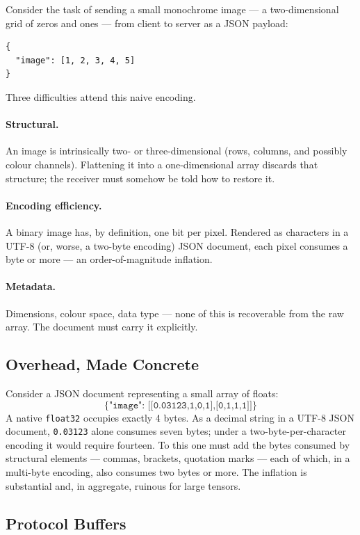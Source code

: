 \documentclass[11pt,a4paper]{article}
\theoremstyle{definition}
\theoremstyle{remark}
\begin{document}
Consider the task of sending a small monochrome image --- a two-dimensional grid of zeros and ones --- from client to server as a JSON payload:
\begin{lstlisting}
{
  "image": [1, 2, 3, 4, 5]
}
\end{lstlisting}

Three difficulties attend this naive encoding.

\paragraph{Structural.}
An image is intrinsically two- or three-dimensional (rows, columns, and possibly colour channels). Flattening it into a one-dimensional array discards that structure; the receiver must somehow be told how to restore it.

\paragraph{Encoding efficiency.}
A binary image has, by definition, one bit per pixel. Rendered as characters in a UTF-8 (or, worse, a two-byte encoding) JSON document, each pixel consumes a byte or more --- an order-of-magnitude inflation.

\paragraph{Metadata.}
Dimensions, colour space, data type --- none of this is recoverable from the raw array. The document must carry it explicitly.

\subsection{Overhead, Made Concrete}

Consider a JSON document representing a small array of floats:
\[
\texttt{\{"image": [[0.03123,1,0,1],[0,1,1,1]]\}}
\]
A native \texttt{float32} occupies exactly 4 bytes. As a decimal string in a UTF-8 JSON document, \texttt{0.03123} alone consumes seven bytes; under a two-byte-per-character encoding it would require fourteen. To this one must add the bytes consumed by structural elements --- commas, brackets, quotation marks --- each of which, in a multi-byte encoding, also consumes two bytes or more. The inflation is substantial and, in aggregate, ruinous for large tensors.

\subsection{Protocol Buffers}
\end{document}
